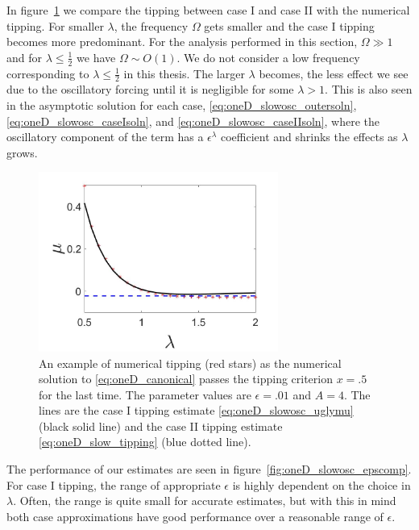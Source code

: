 \indent In figure~\ref{fig:oneD_slowosc_lambdacomp} we compare the tipping between case I and case II with the numerical tipping. For smaller $\lambda$, the frequency $\Omega$ gets smaller and the case I tipping becomes more predominant. For the analysis performed in this section, $\Omega\gg 1$ and for $\lambda\le\frac{1}{2}$ we have $\Omega\sim O(1)$. We do not consider a low frequency corresponding to $\lambda\le\frac{1}{2}$ in this thesis. The larger $\lambda$ becomes, the less effect we see due to the oscillatory forcing until it is negligible for some $\lambda>1$. This is also seen in the asymptotic solution for each case, \eqref{eq:oneD_slowosc_outersoln}, \eqref{eq:oneD_slowosc_caseIsoln}, and \eqref{eq:oneD_slowosc_caseIIsoln}, where the oscillatory component of the term has a $\epsilon^\lambda$ coefficient and shrinks the effects as $\lambda$ grows.

\begin{figure}[H]
\centering
\includegraphics[width=0.7\textwidth]{oneD/slowosc_lambdacomp.jpg}
\caption{An example of numerical tipping (red stars) as the numerical solution to \eqref{eq:oneD_canonical} passes the tipping criterion $x=.5$ for the last time. The parameter values are $\epsilon=.01$ and $A=4$. The lines are the case I tipping estimate \eqref{eq:oneD_slowosc_uglymu} (black solid line) and the case II tipping estimate \eqref{eq:oneD_slow_tipping} (blue dotted line).}
\label{fig:oneD_slowosc_lambdacomp}
\end{figure} 

\indent The performance of our estimates are seen in figure~\ref{fig:oneD_slowosc_epscomp}. For case I tipping, the range of appropriate $\epsilon$ is highly dependent on the choice in $\lambda$. Often, the range is quite small for accurate estimates, but with this in mind both case approximations have good performance over a reasonable range of $\epsilon$.


